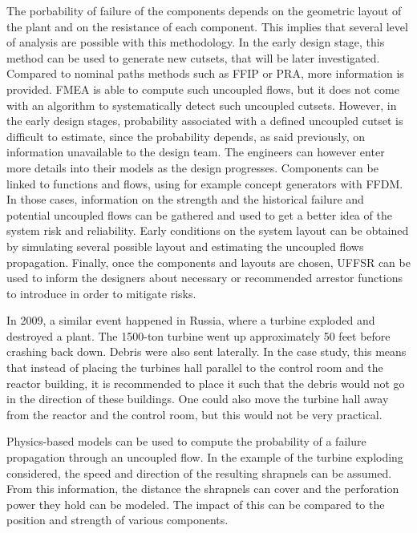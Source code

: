 The porbability of failure of the components depends on the geometric layout of the plant and on the resistance of each component. This implies that several level of analysis are possible with this methodology. In the early design stage, this method can be used to generate new cutsets, that will be later investigated. Compared to nominal paths methods such as FFIP or PRA, more information is provided. FMEA is able to compute such uncoupled flows, but it does not come with an algorithm to systematically detect such uncoupled cutsets. However, in the early design stages, probability associated with a defined uncoupled cutset is difficult to estimate, since the probability depends, as said previously, on information unavailable to the design team. The engineers can however enter more details into their models as the design progresses. Components can be linked to functions and flows, using for example concept generators with FFDM. In those cases, information on the strength and the historical failure and potential uncoupled flows can be gathered and used to get a better idea of the system risk and reliability. Early conditions on the system layout can be obtained by simulating several possible layout and estimating the uncoupled flows propagation. Finally, once the components and layouts are chosen, UFFSR can be used to inform the designers about necessary or recommended arrestor functions to introduce in order to mitigate risks.

In 2009, a similar event happened in Russia, where a turbine exploded and destroyed a plant. The 1500-ton turbine went up approximately 50 feet before crashing back down. Debris were also sent laterally. In the case study, this means that instead of placing the turbines hall parallel to the control room and the reactor building, it is recommended to place it such that the debris would not go in the direction of these buildings. One could also move the turbine hall away from the reactor and the control room, but this would not be very practical.

Physics-based models can be used to compute the probability of a failure propagation through an uncoupled flow. In the example of the turbine exploding considered, the speed and direction of the resulting shrapnels can be assumed. From this information, the distance the shrapnels can cover and the perforation power they hold can be modeled. The impact of this can be compared to the position and strength of various components.

